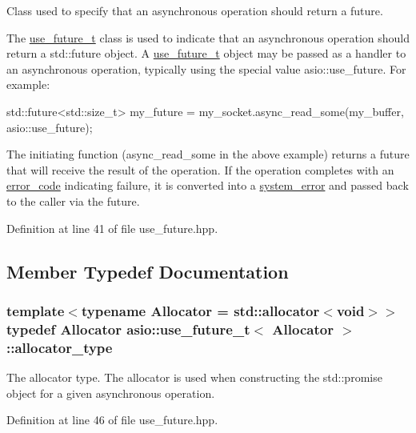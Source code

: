 Class used to specify that an asynchronous operation should return a future. 

The \hyperlink{classasio_1_1use__future__t}{use\+\_\+future\+\_\+t} class is used to indicate that an asynchronous operation should return a std\+::future object. A \hyperlink{classasio_1_1use__future__t}{use\+\_\+future\+\_\+t} object may be passed as a handler to an asynchronous operation, typically using the special value {\ttfamily asio\+::use\+\_\+future}. For example\+:


\begin{DoxyCode}
std::future<std::size\_t> my\_future
 = my\_socket.async\_read\_some(my\_buffer, asio::use\_future); 
\end{DoxyCode}


The initiating function (async\+\_\+read\+\_\+some in the above example) returns a future that will receive the result of the operation. If the operation completes with an \hyperlink{classasio_1_1error__code}{error\+\_\+code} indicating failure, it is converted into a \hyperlink{classasio_1_1system__error}{system\+\_\+error} and passed back to the caller via the future. 

Definition at line 41 of file use\+\_\+future.\+hpp.



\subsection{Member Typedef Documentation}
\hypertarget{classasio_1_1use__future__t_a5f26423d6034eeba715c1249646c4700}{}
\subsubsection[{allocator\+\_\+type}]{\setlength{\rightskip}{0pt plus 5cm}template$<$typename Allocator = std\+::allocator$<$void$>$$>$ typedef Allocator {\bf asio\+::use\+\_\+future\+\_\+t}$<$ Allocator $>$\+::{\bf allocator\+\_\+type}}\label{classasio_1_1use__future__t_a5f26423d6034eeba715c1249646c4700}
The allocator type. The allocator is used when constructing the {\ttfamily std\+::promise} object for a given asynchronous operation. 

Definition at line 46 of file use\+\_\+future.\+hpp.



